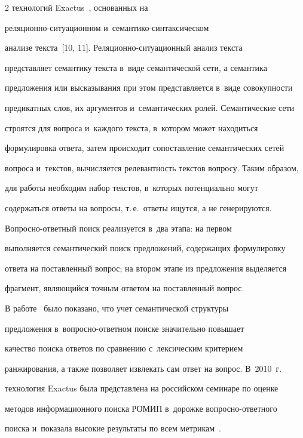 \begin{multicols}{2}
технологий Exactus~\cite{9-sm}, основанных на 


 ре\-ля\-ци\-он\-но-си\-ту\-а\-ци\-он\-ном и~се\-ман\-ти\-ко-син\-так\-си\-че\-ском 


анализе текста~[10, 11]. Ре\-ля\-ци\-он\-но-си\-ту\-а\-ци\-он\-ный анализ текста 


пред\-став\-ля\-ет семантику текста в~виде семантической сети, а семантика 


предложения или высказывания при этом пред\-став\-ля\-ет\-ся в~виде со\-во\-куп\-ности 


предикатных слов, их аргументов и~семантических ролей. Семантические сети 


строятся для вопроса и~каждого текста, в~котором может находиться 


формулировка ответа, затем происходит сопоставление семантических сетей 


вопроса и~текстов, вычисляется релевантность текстов вопросу. Таким образом, 


для работы необходим набор текстов, в~которых потенциально могут 


содержаться ответы на вопросы, т.\,е.\ ответы ищутся, а не генерируются.  


Воп\-рос\-но-от\-вет\-ный поиск реализуется в~два этапа: на первом 


выполняется семантический поиск предложений, содержащих формулировку 


ответа на поставленный вопрос; на втором этапе из предложения выделяется 


фрагмент, являющийся точным ответом на поставленный вопрос.


  


  В работе~\cite{8-sm} было показано, что учет семантической структуры 


предложения в~воп\-рос\-но-от\-вет\-ном поиске значительно повышает 


качество поиска ответов по сравнению с~лексическим критерием 


ранжирования, а также позволяет извлекать сам ответ на вопрос. В~2010~г.\ 


технология Exactus была представлена на российском семинаре по оценке 


методов информационного поиска РОМИП в~дорожке во\-прос\-но-от\-вет\-но\-го 


поиска и~показала высокие результаты по всем метрикам~\cite{12-sm}.



\end{multicols}
